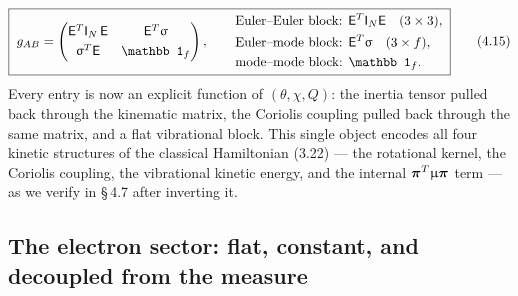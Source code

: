 \begin{equation}
\boxed{\;
g_{AB}=
\begin{pmatrix}
\mathsf E^{T}\mathsf I_N\,\mathsf E & \mathsf E^{T}\Msig\\[3pt]
\Msig^{T}\mathsf E & \mathbb 1_f
\end{pmatrix},\qquad
\begin{aligned}
&\text{Euler--Euler block: }\mathsf E^{T}\mathsf I_N\mathsf E\quad(3\times3),\\
&\text{Euler--mode block: }\mathsf E^{T}\Msig\quad(3\times f),\\
&\text{mode--mode block: }\mathbb 1_f .
\end{aligned}\;}\tag{4.15}
\end{equation}
Every entry is now an explicit function of $(\theta,\chi,Q)$: the inertia tensor pulled back through the kinematic matrix, the Coriolis coupling pulled back through the same matrix, and a flat vibrational block. This single object encodes all four kinetic structures of the classical Hamiltonian (3.22) --- the rotational kernel, the Coriolis coupling, the vibrational kinetic energy, and the internal $\boldsymbol\pi^{T}\upmu\boldsymbol\pi$ term --- as we verify in \S\,4.7 after inverting it.

\subsection{The electron sector: flat, constant, and decoupled from the measure}


